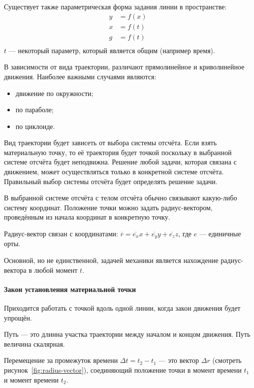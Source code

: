 Существует также параметрическая форма задания линии в пространстве:
\begin{align*}
	y & = f(x) \\
	x & = f(t) \\
	g & = f(t) \\
\end{align*}
\( t \) --- некоторый параметр, который является общим (например время).

В зависимости от вида траектории, различают прямолинейное и криволинейное
движения. Наиболее важными случаями являются:
\begin{itemize}
	\item движение по окружности;
	\item по параболе;
	\item по циклоиде.
\end{itemize}

Вид траектории будет зависеть от выбора системы отсчёта. Если взять
материальную точку, то её траектория будет точкой поскольку в выбранной системе
отсчёта будет неподвижна. Решение любой задачи, которая связана с движением,
может осуществляться только в конкретной системе отсчёта. Правильный выбор
системы отсчёта будет определять решение задачи.

В выбранной системе отсчёта с телом отсчёта обычно связывают какую-либо
систему координат. Положение точки можно задать радиус-вектором,
проведённым из начала координат в конкретную точку.

Радиус-вектор связан с координатами: \( \overline{r} = \overline{e_x} x
+ \overline{e_y} y + \overline{e_z} z \), где $e$ --- единичные орты.

Основной, но не единственной, задачей механики является нахождение
радиус-вектора в любой момент $t$.

\paragraph{Закон установления материальной точки}
Приходится работать с точкой вдоль одной линии, когда закон движения будет
упрощён.

Путь --- это длинна участка траектории между началом и концом движения. Путь
величина скалярная.

Перемещение за промежуток времени \( \Delta t = t_2 - t_1 \) --- это вектор
$\Delta r$ (смотреть рисунок~\ref{fig:radius-vector}), соединяющий положение
точки в момент времени $t_1$ и момент времени $t_2$.

